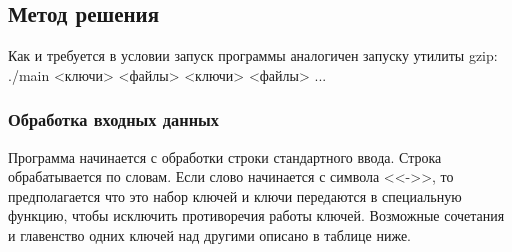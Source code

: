 \documentclass[12pt]{article}
\begin{document}
\subsection*{Метод решения}

Как и требуется в условии запуск программы аналогичен запуску утилиты gzip: ./main <ключи> <файлы> <ключи> <файлы> ...

\subsubsection*{Обработка входных данных}

Программа начинается с обработки строки стандартного ввода. Строка обрабатывается по словам. Если слово начинается с символа <<->>, то предполагается что это набор ключей и ключи передаются в специальную функцию, чтобы исключить противоречия работы ключей. Возможные сочетания и главенство одних ключей над другими описано в таблице ниже.
\end{document}
